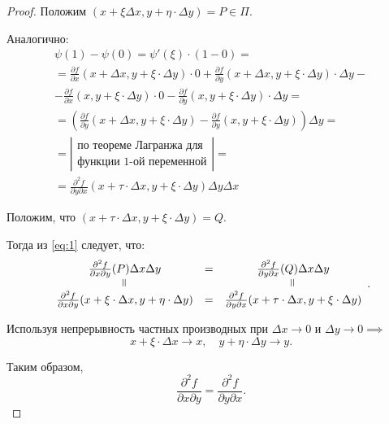 \begin{proof}
    Положим $ (x + \xi \Delta x, y + \eta\cdot \Delta y) = P \in \Pi $.

    Аналогично:
    \begin{multline*}
        \psi(1) - \psi(0) = \psi'(\xi) \cdot (1-0) = \\
        = \frac{\partial f}{\partial x}(x + \Delta x, y + \xi \cdot \Delta y) \cdot 0 + \frac{\partial f}{\partial y}(x + \Delta x, y + \xi \cdot \Delta y) \cdot \Delta y - \\
        - \frac{\partial f}{\partial x}(x, y + \xi \cdot \Delta y) \cdot 0 - \frac{\partial f}{\partial y}(x, y + \xi \cdot \Delta y) \cdot \Delta y = \\
        = \left(\frac{\partial f}{\partial y}(x + \Delta x,y + \xi \cdot \Delta y) - \frac{\partial f}{\partial y}(x, y + \xi \cdot \Delta y)\right) \Delta y = \\
        = \left|\begin{array}{c}
            \text{по теореме Лагранжа для} \\
            \text{функции 1-ой переменной}
        \end{array}\right| = \\
        = \frac{\partial^2f}{\partial y\partial x}(x + \tau \cdot \Delta x, y + \xi \cdot \Delta y)\Delta y \Delta x
    \end{multline*}

    Положим, что $ (x + \tau\cdot \Delta x, y + \xi \cdot \Delta y) = Q $.

    Тогда из \ref{eq:1} следует, что:
    \[
        \begin{array}{ccc}
            \frac{\partial^2f}{\partial x\partial y}(P)\Delta x\Delta y                             & = & \frac{\partial^2f}{\partial y\partial x}(Q)\Delta x\Delta y                           \\
            \verteq                                                                           &   & \verteq                                                                         \\
            \frac{\partial^2f}{\partial x\partial y}(x + \xi \cdot \Delta x, y + \eta\cdot\Delta y) & = & \frac{\partial^2f}{\partial y\partial x}(x + \tau \cdot \Delta x, y+\xi\cdot\Delta y)
        \end{array}.
    \]

    Используя непрерывность частных производных при $ \Delta x \rightarrow0 $ и $ \Delta y \rightarrow0 \implies $
    \[
        x + \xi \cdot \Delta x \rightarrow x, \quad y + \eta \cdot \Delta y \rightarrow y.
    \]

    Таким образом,
    \[
        \frac{\partial^2f}{\partial x\partial y} = \frac{\partial^2f}{\partial y\partial x}.
    \]
\end{proof}

